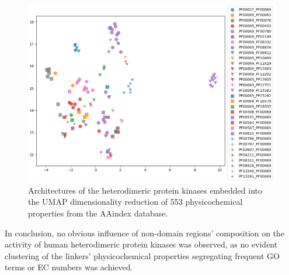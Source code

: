 	\begin{figure}
		\centering
		\includegraphics[width=0.9\linewidth]{img/aa_umap_arch.png}
		\caption{Architectures of the heterodimeric protein kinases embedded into the UMAP
		dimensionality reduction of 553 physicochemical properties from the AAindex database.}
		\label{fig:aa_umap}
	\end{figure}

	In conclusion, no obvious influence of non-domain regions' composition on the activity
	of human heterodimeric protein kinases was observed, as no evident clustering of the
	linkers' physicochemical properties segregating frequent GO terms or EC numbers was
	achieved.


